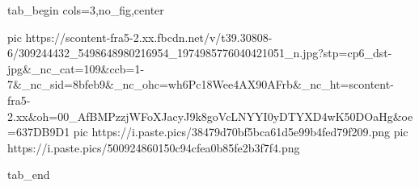  
 
 
 
 


\ifcmt
  tab_begin cols=3,no_fig,center

     pic https://scontent-fra5-2.xx.fbcdn.net/v/t39.30808-6/309244432_5498648980216954_1974985776040421051_n.jpg?stp=cp6_dst-jpg&_nc_cat=109&ccb=1-7&_nc_sid=8bfeb9&_nc_ohc=wh6Pc18Wee4AX90AFrb&_nc_ht=scontent-fra5-2.xx&oh=00_AfBMPzzjWFoXJacyJ9k8goVcLNYYI0yDTYXD4wK50DOaHg&oe=637DB9D1
     pic https://i.paste.pics/38479d70bf5bca61d5e99b4fed79f209.png
     pic https://i.paste.pics/500924860150c94cfea0b85fe2b3f7f4.png

  tab_end
\fi
